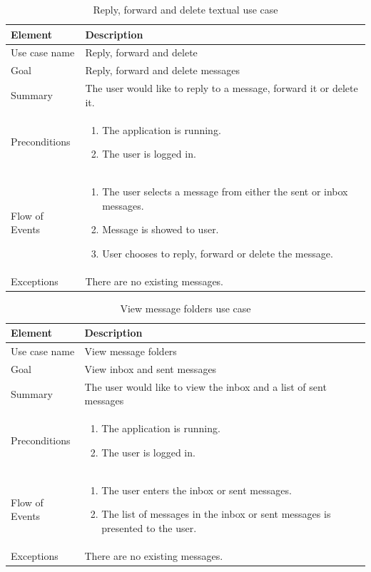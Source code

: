 \begin{table}
\begin{tabular}{p{3cm}p{12cm}}

Element & Description \\ \hline
Use case name & Reply, forward and delete \\
Goal & Reply, forward and delete messages\\
Summary & The user would like to reply to a message, forward it or delete it. \\
Preconditions &
\begin{enumerate}
\item{}The application is running.
\item{}The user is logged in.
\end{enumerate} \\ \hline
Flow of Events &
\begin{enumerate}
\item{}The user selects a message from either the sent or inbox messages.
\item{}Message is showed to user.
\item{}User chooses to reply, forward or delete the message. 
\end{enumerate} \\ \hline
Exceptions & There are no existing messages.
\end{tabular}
\caption{Reply, forward and delete textual use case} \label{tab:viewmessages}
\end{table}

\begin{table}
\begin{tabular}{p{3cm}p{12cm}}

Element & Description \\ \hline
Use case name & View message folders \\
Goal & View inbox and sent messages \\
Summary &The user would like to view the inbox and a list of sent messages \\
Preconditions &
\begin{enumerate}
\item{}The application is running.
\item{}The user is logged in.
\end{enumerate} \\ \hline
Flow of Events &
\begin{enumerate}
\item{}The user enters the inbox or sent messages.
\item{}The list of messages in the inbox or sent messages is presented to the user.
\end{enumerate} \\ \hline
Exceptions & There are no existing messages.
\end{tabular}
\caption{View message folders use case} \label{tab:viewmessages}
\end{table}

